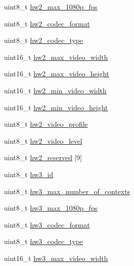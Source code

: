 \begin{DoxyCompactItemize}
uint8\+\_\+t \mbox{\hyperlink{struct__ni__nvme__identify_a7ed5fdb3fa31d26c3c6af37a8450df79}{hw2\+\_\+max\+\_\+1080p\+\_\+fps}}
\item 
uint8\+\_\+t \mbox{\hyperlink{struct__ni__nvme__identify_a3061d5aff3eee5dc194de37ceea0d357}{hw2\+\_\+codec\+\_\+format}}
\item 
uint8\+\_\+t \mbox{\hyperlink{struct__ni__nvme__identify_a931d92290df4a1f26028db6a605f50db}{hw2\+\_\+codec\+\_\+type}}
\item 
uint16\+\_\+t \mbox{\hyperlink{struct__ni__nvme__identify_a1d12cb1c64e020f7349e76c4a023d66f}{hw2\+\_\+max\+\_\+video\+\_\+width}}
\item 
uint16\+\_\+t \mbox{\hyperlink{struct__ni__nvme__identify_aed0832d7f053fd13442408f811257ed8}{hw2\+\_\+max\+\_\+video\+\_\+height}}
\item 
uint16\+\_\+t \mbox{\hyperlink{struct__ni__nvme__identify_aea461f52e30b9f7fa0e20888ad27ecf2}{hw2\+\_\+min\+\_\+video\+\_\+width}}
\item 
uint16\+\_\+t \mbox{\hyperlink{struct__ni__nvme__identify_aa5c61e2fe3a71619a6a3cae520eb7cb3}{hw2\+\_\+min\+\_\+video\+\_\+height}}
\item 
uint8\+\_\+t \mbox{\hyperlink{struct__ni__nvme__identify_a09569dddd094dd3a66e7ac7cdc991690}{hw2\+\_\+video\+\_\+profile}}
\item 
uint8\+\_\+t \mbox{\hyperlink{struct__ni__nvme__identify_af3d71564560c97a67a4bb6ec908e78dd}{hw2\+\_\+video\+\_\+level}}
\item 
uint8\+\_\+t \mbox{\hyperlink{struct__ni__nvme__identify_a742d9eacbb52971dd3cef3342bdfc956}{hw2\+\_\+reserved}} \mbox{[}9\mbox{]}
\item 
uint8\+\_\+t \mbox{\hyperlink{struct__ni__nvme__identify_acd4ee205b971c4c1d21b5cb5ededd50e}{hw3\+\_\+id}}
\item 
uint8\+\_\+t \mbox{\hyperlink{struct__ni__nvme__identify_a1caff47674f52f2bc4668aaaf369ea35}{hw3\+\_\+max\+\_\+number\+\_\+of\+\_\+contexts}}
\item 
uint8\+\_\+t \mbox{\hyperlink{struct__ni__nvme__identify_a964f98e78dadb3df88af5b48dbbae7b3}{hw3\+\_\+max\+\_\+1080p\+\_\+fps}}
\item 
uint8\+\_\+t \mbox{\hyperlink{struct__ni__nvme__identify_a7e3b554a0079d82def42eccbfeb809c1}{hw3\+\_\+codec\+\_\+format}}
\item 
uint8\+\_\+t \mbox{\hyperlink{struct__ni__nvme__identify_ab071a375f6d8cf7d648041b0ebf61e97}{hw3\+\_\+codec\+\_\+type}}
\item 
uint16\+\_\+t \mbox{\hyperlink{struct__ni__nvme__identify_ab32104783327a5bebee2c42c810438df}{hw3\+\_\+max\+\_\+video\+\_\+width}}

\end{DoxyCompactItemize}
